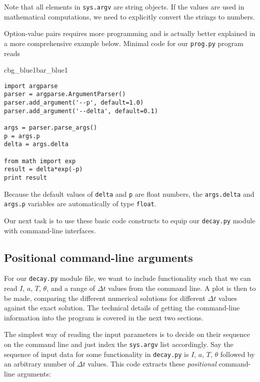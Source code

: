 \documentclass[graybox,sectrefs,envcountresetchap,open=right,final]{svmonodo}
\newenvironment{_pro_tight}[2]{
   \def\FrameCommand{\color{#2}\vrule width 1mm\normalcolor\colorbox{#1}}
   \FrameRule0.6pt\MakeFramed {\advance\hsize-2mm\FrameRestore}\vskip3mm}
   {\vskip0mm\endMakeFramed}
\newenvironment{pro}[2]{
\bgroup\rmfamily
\fboxsep=0mm\relax
\begin{_pro_tight}{#1}{#2}
\list{}{\parsep=-2mm\parskip=0mm\topsep=0pt\leftmargin=2mm
\rightmargin=2\leftmargin\leftmargin=4pt\relax}
\item\relax}
{\endlist\end{_pro_tight}\egroup}
\newenvironment{warning_mdfboxadmon}[1][]{
\begin{warning_mdfboxmdframed}[frametitle=#1]
}
{
\end{warning_mdfboxmdframed}
}
\begin{document}
\begin{warning_mdfboxadmon}
Note that all elements in \texttt{sys.argv} are string objects.
If the values are used in mathematical computations, we need
to explicitly convert the strings to numbers.
\end{warning_mdfboxadmon}



Option-value pairs requires more programming and is actually
better explained in a more comprehensive example below.
Minimal code for our \texttt{prog.py} program reads

\begin{pro}{cbg_blue1}{bar_blue1}\begin{Verbatim}[numbers=none,fontsize=\fontsize{9pt}{9pt},baselinestretch=0.95,xleftmargin=2mm]
import argparse
parser = argparse.ArgumentParser()
parser.add_argument('--p', default=1.0)
parser.add_argument('--delta', default=0.1)

args = parser.parse_args()
p = args.p
delta = args.delta

from math import exp
result = delta*exp(-p)
print result
\end{Verbatim}
\end{pro}
\noindent
Because the default values of \texttt{delta} and \texttt{p} are float numbers,
the \texttt{args.delta} and \texttt{args.p} variables are automatically of type \texttt{float}.

Our next task is to use these basic code constructs to equip our
\texttt{decay.py} module with command-line interfaces.

\subsection{Positional command-line arguments}


For our \texttt{decay.py} module file, we want to include functionality such
that we can read $I$, $a$, $T$, $\theta$, and a range of $\Delta t$
values from the command line.  A plot is then to be made, comparing
the different numerical solutions for different $\Delta t$ values
against the exact solution. The technical details of getting the
command-line information into the program is covered in the next
two sections.

The simplest way of reading the input parameters is to
decide on their sequence on the command line and just index
the \texttt{sys.argv} list accordingly.
Say the sequence of input data for some functionality in
\texttt{decay.py} is $I$, $a$, $T$, $\theta$ followed by an
arbitrary number of $\Delta t$ values. This code extracts
these \emph{positional} command-line arguments:
\end{document}
